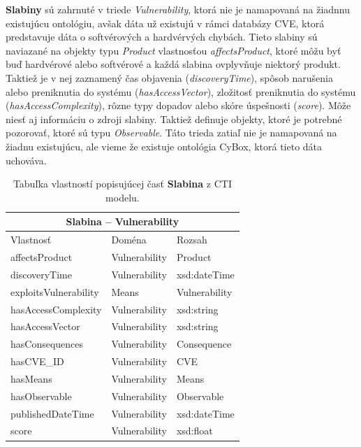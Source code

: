 \documentclass[12pt, a4paper, oneside]{book}
\begin{document}
\textbf{Slabiny} sú zahrnuté v triede \textit{Vulnerability}, ktorá nie je namapovaná na žiadnnu existujúcu ontológiu, avšak dáta už existujú v rámci databázy CVE, ktorá predstavuje dáta o softvérových a hardvérvých chybách. Tieto slabiny sú naviazané na objekty typu \textit{Product} vlastnosťou \textit{affectsProduct}, ktoré môžu byť buď hardvérové alebo softvérové a každá slabina ovplyvňuje niektorý produkt. Taktiež je v nej zaznamený čas objavenia (\textit{discoveryTime}), spôsob narušenia alebo preniknutia do systému (\textit{hasAccessVector}), zložitosť preniknutia do systému (\textit{hasAccessComplexity}), rôzne typy dopadov alebo skóre úspešnosti (\textit{score}). Môže niesť aj informáciu o zdroji slabiny. Taktiež definuje objekty, ktoré je potrebné pozorovať, ktoré sú typu \textit{Observable}. Táto trieda zatiaľ nie je namapovaná na žiadnu existujúcu, ale vieme že existuje ontológia CyBox, ktorá tieto dáta uchováva. 
\begin{table}[hbt!]
\centering
\begin{tabular}{ |p{5cm}||p{3cm}|p{3cm}|  }
 \hline
 \multicolumn{3}{|c|}{Slabina -- Vulnerability} \\
 \hline
 Vlastnosť & Doména & Rozsah\\
 \hline
 affectsProduct & Vulnerability & Product\\
 discoveryTime & Vulnerability & xsd:dateTime\\
 exploitsVulnerability & Means & Vulnerability\\
 hasAccessComplexity & Vulnerability & xsd:string\\
 hasAccessVector & Vulnerability & xsd:string\\
 hasConsequences & Vulnerability & Consequence\\
 hasCVE\_{}ID & Vulnerability & CVE\\
 hasMeans & Vulnerability & Means\\
 hasObservable & Vulnerability & Observable\\
 publishedDateTime & Vulnerability & xsd:dateTime\\
 score & Vulnerability & xsd:float\\
 \hline
\end{tabular}
\caption{Tabuľka vlastností popisujúcej časť \textbf{Slabina} z CTI modelu.}
\label{tab:template}
\end{table}
\end{document}

